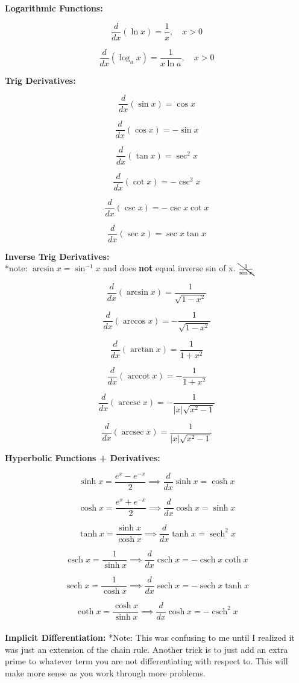 \documentclass[fleqn]{article}
\DeclareMathOperator{\arcsec}{arcsec}
\DeclareMathOperator{\arccot}{arccot}
\DeclareMathOperator{\arccsc}{arccsc}
\DeclareMathOperator{\sech}{sech}
\DeclareMathOperator{\csch}{csch}
\begin{document}
\textbf{Logarithmic Functions:}

\[\frac{d}{dx}(\ln x) = \frac{1}{x}, \quad x > 0\]

\[\frac{d}{dx}(\log_a x) = \frac{1}{x \ln a}, \quad x > 0\]


\textbf{Trig Derivatives:}

\[\frac{d}{dx}(\sin x) = \cos x\]

\[\frac{d}{dx}(\cos x) = -\sin x\]

\[\frac{d}{dx}(\tan x) = \sec^2 x\]

\[\frac{d}{dx}(\cot x) = -\csc^2 x\]

\[\frac{d}{dx}(\csc x) = -\csc x \cot x\]

\[\frac{d}{dx}(\sec x) = \sec x \tan x\]

\textbf{Inverse Trig Derivatives:}
\\

*note: $\arcsin x = \sin^{-1} x$ and does \textbf{not} equal inverse sin of x. $\bcancel{\frac{1}{\sin x}}$

\[\frac{d}{dx}(\arcsin x) = \frac{1}{\sqrt{1-x^2}} \]

\[\frac{d}{dx}(\arccos x) = -\frac{1}{\sqrt{1-x^2}}\]

\[\frac{d}{dx}(\arctan x) = \frac{1}{1+x^2}\]

\[\frac{d}{dx}(\arccot x) = -\frac{1}{1+x^2}\]

\[\frac{d}{dx}(\arccsc x) = -\frac{1}{|x|\sqrt{x^2-1}}\]

\[\frac{d}{dx}(\arcsec x) = \frac{1}{|x|\sqrt{x^2-1}}\]

\textbf{Hyperbolic Functions + Derivatives:}

\[\sinh x = \frac{e^x-e^{-x}}{2} \implies \frac{d}{dx} \sinh x = \cosh x\]

\[\cosh x = \frac{e^x+e^{-x}}{2} \implies \frac{d}{dx} \cosh x = \sinh x\]

\[\tanh x = \frac{\sinh x}{\cosh x} \implies \frac{d}{dx} \tanh x = \sech^2 x\]

\[\csch x = \frac{1}{\sinh x} \implies \frac{d}{dx} \csch x = -\csch x\coth x\]

\[\sech x = \frac{1}{\cosh x} \implies \frac{d}{dx} \sech x = -\sech x\tanh x\]

\[\coth x = \frac{\cosh x}{\sinh x} \implies \frac{d}{dx} \cosh x = -\csch^2 x\]
\\

\textbf{Implicit Differentiation: }
*Note: This was confusing to me until I realized it was just an extension of the chain rule. Another trick is to just add an extra prime to whatever term you are not differentiating with respect to. This will make more sense as you work through more problems. 
\end{document}
